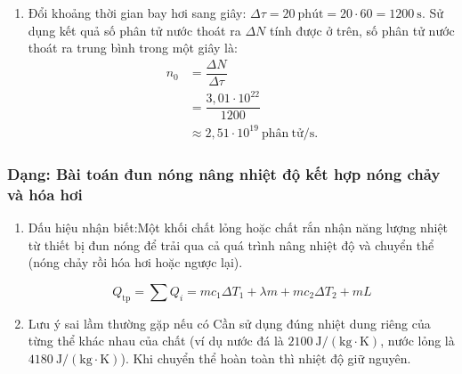 \begin{vidumau}
{\begin{enumerate}
\[\begin{aligned}
			&= 3{,}01 \cdot 10^{22}\ \mathrm{phân\ tử}.
		\end{aligned}
		\]
		\item Đổi khoảng thời gian bay hơi sang giây: $\Delta \tau = 20\ \mathrm{ph\text{ú}t} = 20 \cdot 60 = 1200\ \mathrm{s}$.
		Sử dụng kết quả số phân tử nước thoát ra $\Delta N$ tính được ở trên, số phân tử nước thoát ra trung bình trong một giây là:
		\[
		\begin{aligned}
			n_0 &= \dfrac{\Delta N}{\Delta \tau} \\
			&= \dfrac{3{,}01 \cdot 10^{22}}{1200} \\
			&\approx 2{,}51 \cdot 10^{19}\ \mathrm{phân\ tử/s}.
		\end{aligned}
		\]
	\end{enumerate}
}
\end{vidumau}

\subsubsection{Dạng: Bài toán đun nóng nâng nhiệt độ kết hợp nóng chảy và hóa hơi}

\begin{phuongphap}
	\begin{enumerate}
		\item Dấu hiệu nhận biết:Một khối chất lỏng hoặc chất rắn nhận năng lượng nhiệt từ thiết bị đun nóng để trải qua cả quá trình nâng nhiệt độ và chuyển thể (nóng chảy rồi hóa hơi hoặc ngược lại).
	
			\begin{equation}
				Q_{\text{tp}} = \sum Q_i = m c_1 \Delta T_1 + \lambda m + m c_2 \Delta T_2 + m L
				\label{eq:full_heating}
		\end{equation}
		\item Lưu ý sai lầm thường gặp nếu có Cần sử dụng đúng nhiệt dung riêng của từng thể khác nhau của chất (ví dụ nước đá là $2100\ \mathrm{J/(kg\cdot K)}$, nước lỏng là $4180\ \mathrm{J/(kg\cdot K)}$). Khi chuyển thể hoàn toàn thì nhiệt độ giữ nguyên.
	\end{enumerate}
\end{phuongphap}

